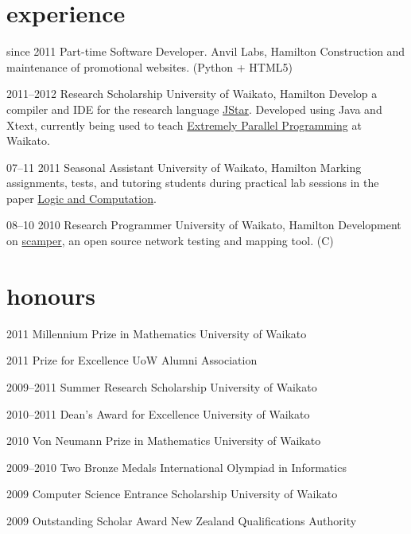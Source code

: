 \documentclass[]{boris-cv}
\begin{document}
\section{experience}

\begin{entrylist}
  \entry
    {since 2011}
    {Part-time Software Developer.}
    {Anvil Labs, Hamilton}
    {Construction and maintenance of promotional websites. (Python + HTML5)}

  \entry
    {2011--2012}
    {Research Scholarship}
    {University of Waikato, Hamilton}
    {Develop a compiler and IDE for the research language
    \href{http://www.cs.waikato.ac.nz/research/jstar/}{JStar}.
    Developed using Java and Xtext, currently being used to teach
    \href{http://papers.waikato.ac.nz/subjects/COMP/COMP553}
    {Extremely Parallel Programming} at Waikato.}

  \entry
    {07--11 2011}
    {Seasonal Assistant}
    {University of Waikato, Hamilton}
    {Marking assignments, tests, and tutoring students during
    practical lab sessions in the paper
    \href{http://papers.waikato.ac.nz/subjects/COMP/COMP235}
    {Logic and Computation}.}

  \entry
    {08--10 2010}
    {Research Programmer}
    {University of Waikato, Hamilton}
    {Development on
    \href{http://www.wand.net.nz/scamper}{scamper},
    an open source network testing and mapping tool. (C)}
\end{entrylist}

\section{honours}
\begin{entrylist}
  \titleentry
    {2011}
    {Millennium Prize in Mathematics}
    {University of Waikato}

  \titleentry
    {2011}
    {Prize for Excellence}
    {UoW Alumni Association}

  \titleentry
    {2009--2011}
    {Summer Research Scholarship}
    {University of Waikato}

  \titleentry
    {2010--2011}
    {Dean's Award for Excellence}
    {University of Waikato}

  \titleentry
    {2010}
    {Von Neumann Prize in Mathematics}
    {University of Waikato}

  \titleentry
    {2009--2010}
    {Two Bronze Medals}
    {International Olympiad in Informatics}

  \titleentry
    {2009}
    {Computer Science Entrance Scholarship}
    {University of Waikato}

  \titleentry
    {2009}
    {Outstanding Scholar Award}
    {New Zealand Qualifications Authority}
\end{entrylist}
\end{document}
